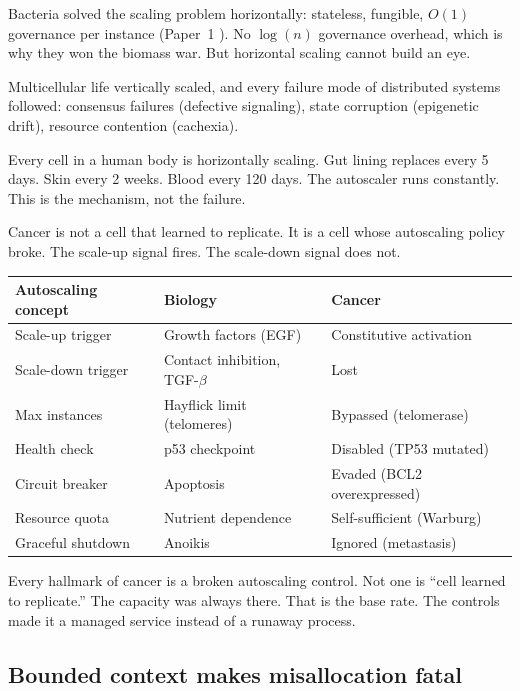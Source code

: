 \documentclass[11pt]{article}
\theoremstyle{definition}
\begin{document}
Bacteria solved the scaling problem horizontally: stateless, fungible,
$O(1)$ governance per instance (Paper~1 \cite{McCarthy2026a}). No
$\log(n)$ governance overhead, which is why they won the biomass war.
But horizontal scaling cannot build an eye.

Multicellular life vertically scaled, and every failure mode of
distributed systems followed: consensus failures (defective signaling),
state corruption (epigenetic drift), resource contention (cachexia).

Every cell in a human body is horizontally scaling. Gut lining
replaces every 5 days. Skin every 2 weeks. Blood every 120 days.
The autoscaler runs constantly. This is the mechanism, not the
failure.

Cancer is not a cell that learned to replicate. It is a cell whose
autoscaling policy broke. The scale-up signal fires. The scale-down
signal does not.

\begin{center}
\small
\begin{tabular}{lll}
\toprule
\textbf{Autoscaling concept} & \textbf{Biology} & \textbf{Cancer} \\
\midrule
Scale-up trigger & Growth factors (EGF) & Constitutive activation \\
Scale-down trigger & Contact inhibition, TGF-$\beta$ & Lost \\
Max instances & Hayflick limit (telomeres) & Bypassed (telomerase) \\
Health check & p53 checkpoint & Disabled (TP53 mutated) \\
Circuit breaker & Apoptosis & Evaded (BCL2 overexpressed) \\
Resource quota & Nutrient dependence & Self-sufficient (Warburg) \\
Graceful shutdown & Anoikis & Ignored (metastasis) \\
\bottomrule
\end{tabular}
\end{center}

Every hallmark of cancer \cite{Hanahan2011} is a broken autoscaling
control. Not one is ``cell learned to replicate.'' The capacity was
always there. That is the base rate. The controls made it a managed
service instead of a runaway process.

\subsection{Bounded context makes misallocation fatal}
\end{document}

